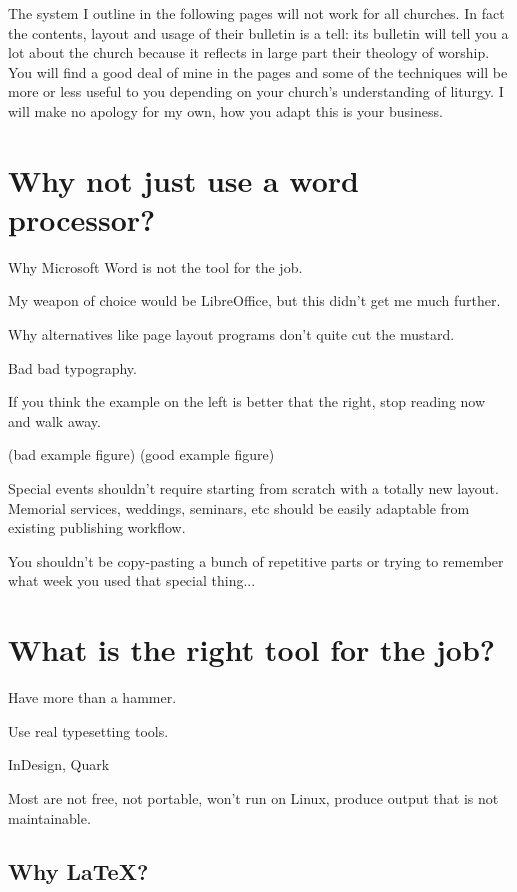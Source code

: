 \documentclass[12pt]{scrartcl}
\begin{document}
The system I outline in the following pages will not work for all churches. In
fact the contents, layout and usage of their bulletin is a tell: its bulletin
will tell you a lot about the church because it reflects in large part their
theology of worship. You will find a good deal of mine in the pages and some of
the techniques will be more or less useful to you depending on your church's
understanding of liturgy. I will make no apology for my own, how you adapt this
is your business.

\tableofcontents


\section{Why not just use a word processor?}

Why Microsoft Word is not the tool for the job.

My weapon of choice would be LibreOffice, but this didn't get me much further.

Why alternatives like page layout programs don't quite cut the mustard.

Bad bad typography.

If you think the example on the left is better that the right, stop reading now
and walk away.

(bad example figure) (good example figure)

Special events shouldn't require starting from scratch with a totally new
layout. Memorial services, weddings, seminars, etc should be easily adaptable
from existing publishing workflow.

You shouldn't be copy-pasting a bunch of repetitive parts or trying to remember
what week you used that special thing...

\section{What is the right tool for the job?}

Have more than a hammer.

Use real typesetting tools.

InDesign, Quark

Most are not free, not portable, won't run on Linux, produce output that is not
maintainable.

\subsection{Why \LaTeX?}
\end{document}
